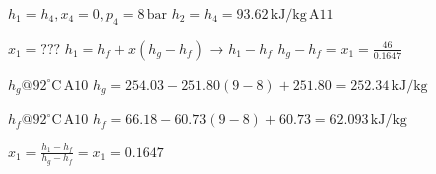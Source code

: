 \( h_1 = h_4, x_4 = 0, p_4 = 8 \, \text{bar} \)  
\( h_2 = h_4 = 93.62 \, \text{kJ/kg} \, \text{A11} \)  

\( x_1 = ??? \)  
\( h_1 = h_f + x(h_g - h_f) \)  
→ \( h_1 - h_f \)  
\( h_g - h_f = x_1 = \frac{46}{0.1647} \)  

\( h_g @ 92^\circ \text{C} \, \text{A10} \)  
\( h_g = 254.03 - 251.80 (9 - 8) + 251.80 = 252.34 \, \text{kJ/kg} \)  

\( h_f @ 92^\circ \text{C} \, \text{A10} \)  
\( h_f = 66.18 - 60.73 (9 - 8) + 60.73 = 62.093 \, \text{kJ/kg} \)  

\( x_1 = \frac{h_1 - h_f}{h_g - h_f} = x_1 = 0.1647 \)
